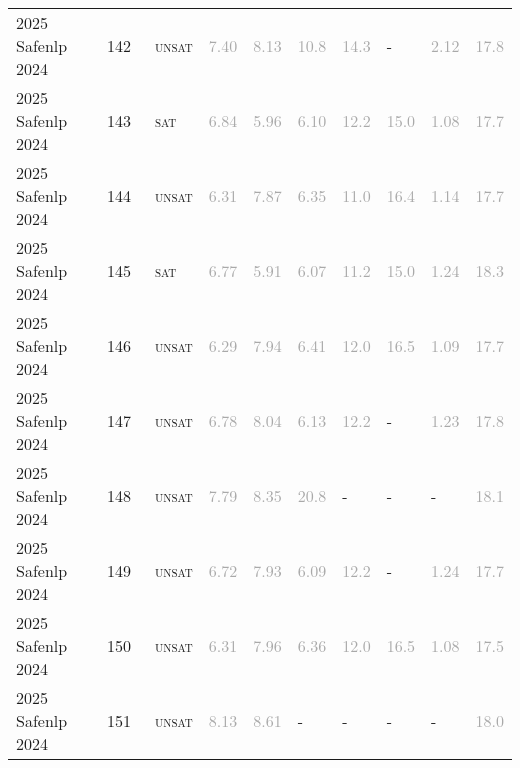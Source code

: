 \begin{center}
{\begin{longtable}{@{}llllllllll@{}}
2025 Safenlp 2024 & 142 & ~\textsc{unsat} & \textcolor{darkgray}{7.40} & \textcolor{darkgray}{8.13} & \textcolor{darkgray}{10.8} & \textcolor{darkgray}{14.3} & - & \textcolor{darkgray}{2.12} & \textcolor{darkgray}{17.8} \\
2025 Safenlp 2024 & 143 & ~\textsc{sat} & \textcolor{darkgray}{6.84} & \textcolor{darkgray}{5.96} & \textcolor{darkgray}{6.10} & \textcolor{darkgray}{12.2} & \textcolor{darkgray}{15.0} & \textcolor{darkgray}{1.08} & \textcolor{darkgray}{17.7} \\
2025 Safenlp 2024 & 144 & ~\textsc{unsat} & \textcolor{darkgray}{6.31} & \textcolor{darkgray}{7.87} & \textcolor{darkgray}{6.35} & \textcolor{darkgray}{11.0} & \textcolor{darkgray}{16.4} & \textcolor{darkgray}{1.14} & \textcolor{darkgray}{17.7} \\
2025 Safenlp 2024 & 145 & ~\textsc{sat} & \textcolor{darkgray}{6.77} & \textcolor{darkgray}{5.91} & \textcolor{darkgray}{6.07} & \textcolor{darkgray}{11.2} & \textcolor{darkgray}{15.0} & \textcolor{darkgray}{1.24} & \textcolor{darkgray}{18.3} \\
2025 Safenlp 2024 & 146 & ~\textsc{unsat} & \textcolor{darkgray}{6.29} & \textcolor{darkgray}{7.94} & \textcolor{darkgray}{6.41} & \textcolor{darkgray}{12.0} & \textcolor{darkgray}{16.5} & \textcolor{darkgray}{1.09} & \textcolor{darkgray}{17.7} \\
2025 Safenlp 2024 & 147 & ~\textsc{unsat} & \textcolor{darkgray}{6.78} & \textcolor{darkgray}{8.04} & \textcolor{darkgray}{6.13} & \textcolor{darkgray}{12.2} & - & \textcolor{darkgray}{1.23} & \textcolor{darkgray}{17.8} \\
2025 Safenlp 2024 & 148 & ~\textsc{unsat} & \textcolor{darkgray}{7.79} & \textcolor{darkgray}{8.35} & \textcolor{darkgray}{20.8} & - & - & - & \textcolor{darkgray}{18.1} \\
2025 Safenlp 2024 & 149 & ~\textsc{unsat} & \textcolor{darkgray}{6.72} & \textcolor{darkgray}{7.93} & \textcolor{darkgray}{6.09} & \textcolor{darkgray}{12.2} & - & \textcolor{darkgray}{1.24} & \textcolor{darkgray}{17.7} \\
2025 Safenlp 2024 & 150 & ~\textsc{unsat} & \textcolor{darkgray}{6.31} & \textcolor{darkgray}{7.96} & \textcolor{darkgray}{6.36} & \textcolor{darkgray}{12.0} & \textcolor{darkgray}{16.5} & \textcolor{darkgray}{1.08} & \textcolor{darkgray}{17.5} \\
2025 Safenlp 2024 & 151 & ~\textsc{unsat} & \textcolor{darkgray}{8.13} & \textcolor{darkgray}{8.61} & - & - & - & - & \textcolor{darkgray}{18.0} \\

\end{longtable}}
\end{center}
